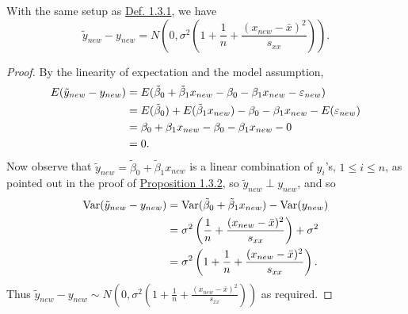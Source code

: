 \documentclass[11pt,fleqn]{book} %
\begin{document}
\begin{proposition} \label{prop:135}
With the same setup as \hyperref[def:131]{Def. 1.3.1}, we have
\[
\tilde{y}_{new} - y_{new} = N\left(0, \sigma^2\left(1 + \frac1n + \frac{(x_{new} - \bar{x})^2}{s_{xx}}\right)\right).
\]
\end{proposition}
\begin{proof} By the linearity of expectation and the model assumption,
\[
\begin{aligned}
E(\tilde{y}_{new} - y_{new}) &= E(\tilde{\beta}_0 + \tilde{\beta}_1x_{new} - \beta_0 - \beta_1x_{new} - \varepsilon_{new}) \\
&= E(\tilde{\beta}_0) + E(\tilde{\beta}_1x_{new}) - \beta_0 - \beta_1x_{new} - E(\varepsilon_{new}) \\
&= \beta_0 + \beta_1x_{new} - \beta_0 - \beta_1x_{new} - 0 \\
&= 0.
\end{aligned}
\]
\indent Now observe that \(\tilde{y}_{new} = \tilde{\beta}_0 + \tilde{\beta}_1x_{new}\) is a linear combination of \(y_i\)'s, \(1 \leq i \leq n\), as pointed out in the proof of \hyperref[prop:132]{Proposition 1.3.2}, so \(\tilde{y}_{new} \perp y_{new}\), and so
\[
\begin{aligned}
\operatorname{Var}(\tilde{y}_{new} - y_{new}) &= \operatorname{Var}(\tilde{\beta}_0 + \tilde{\beta}_1x_{new}) - \operatorname{Var}(y_{new}) \\
&= \sigma^2\left(\frac1n + \frac{(x_{new} - \bar{x})^2}{s_{xx}}\right) + \sigma^2 \\
&= \sigma^2\left(1 + \frac1n + \frac{(x_{new} - \bar{x})^2}{s_{xx}}\right).
\end{aligned}
\]
\indent Thus \(\tilde{y}_{new} - y_{new} \sim N\left(0, \sigma^2\left(1 + \frac1n + \frac{(x_{new} - \bar{x})^2}{s_{xx}}\right)\right)\) as required.
\end{proof}
\end{document}
